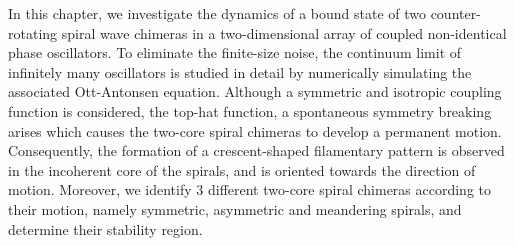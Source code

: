 In this chapter, we investigate the dynamics of a bound state of two counter-rotating spiral wave chimeras
 in a two-dimensional array of coupled non-identical
phase oscillators. To eliminate the finite-size noise, the
continuum limit of infinitely many oscillators is studied in detail
by numerically simulating the
associated Ott-Antonsen equation. Although a symmetric and isotropic coupling function is considered,
the top-hat function, a spontaneous symmetry breaking arises which causes
the two-core spiral chimeras to develop a permanent motion. Consequently,
the formation of a crescent-shaped filamentary pattern is observed in the incoherent core
of the spirals, and is oriented towards the direction of motion.  Moreover, we identify 3 
different two-core spiral chimeras according to their motion, namely symmetric, asymmetric
and meandering spirals, and determine their stability region.


 








